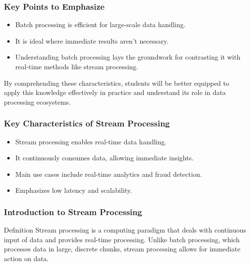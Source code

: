 \documentclass[aspectratio=169]{beamer}
\begin{document}
\begin{frame}[fragile]
    \frametitle{Key Points to Emphasize}
    \begin{itemize}
        \item Batch processing is efficient for large-scale data handling.
        \item It is ideal where immediate results aren't necessary.
        \item Understanding batch processing lays the groundwork for contrasting it with real-time methods like stream processing.
    \end{itemize}
    By comprehending these characteristics, students will be better equipped to apply this knowledge effectively in practice and understand its role in data processing ecosystems.
\end{frame}

\begin{frame}[fragile]
    \frametitle{Key Characteristics of Stream Processing}
    \begin{itemize}
        \item Stream processing enables real-time data handling.
        \item It continuously consumes data, allowing immediate insights.
        \item Main use cases include real-time analytics and fraud detection.
        \item Emphasizes low latency and scalability.
    \end{itemize}
\end{frame}

\begin{frame}[fragile]
    \frametitle{Introduction to Stream Processing}
    \begin{block}{Definition}
        Stream processing is a computing paradigm that deals with continuous input of data and provides real-time processing.
        Unlike batch processing, which processes data in large, discrete chunks, stream processing allows for immediate action on data.
    \end{block}
\end{frame}
\end{document}
